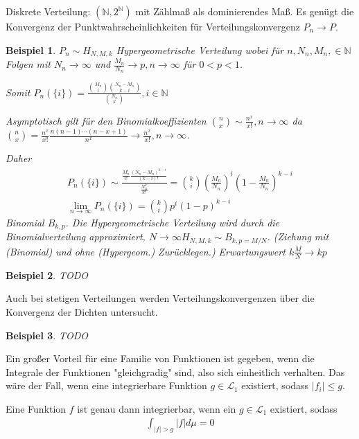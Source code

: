 \documentclass[]{article}
\newtheorem*{example}{Beispiel}
\begin{document}
Diskrete Verteilung: $(\mathbb{N}, 2^\mathbb{N})$ mit Zählmaß als dominierendes Maß. Es genügt die Konvergenz der Punktwahrscheinlichkeiten für Verteilungskonvergenz $P_n \rightarrow P$.

\begin{example}
	$P_n \sim H_{N,M,k}$ Hypergeometrische Verteilung wobei für $n, N_n, M_n, \in \mathbb{N}$ Folgen mit $N_n \rightarrow \infty$ und $\frac{M_n}{N_n} \rightarrow p, n\rightarrow\infty$ für $0 < p < 1$.
	
	Somit $P_n(\{i\}) = \frac{\binom{M_n}{i}\binom{N_n-M_n}{k-i}}{\binom{N_n}{k}}, i\in \mathbb{N}$
	
	Asymptotisch gilt für den Binomialkoeffizienten $\binom{n}{x} \sim \frac{n^x}{x!}, n\rightarrow\infty$ da $\binom{n}{x} = \frac{n^x}{x!} \frac{n(n-1)\cdots(n-x+1)}{n^x} \rightarrow \frac{n^x}{x!}, n\rightarrow\infty$.
	
	Daher
	\begin{align*}
		P_n(\{i\}) \sim \frac{\frac{M_n^i}{i!}\frac{(N_n-M_n)^{k-i}}{(k-i)!}}{\frac{N_n^k}{k!}} = \binom{k}{i} \left(\frac{M_n}{N_n}\right)^i \left(1-\frac{M_n}{N_n}\right)^{k-i}\\
		\lim\limits_{n\rightarrow\infty} P_n(\{i\}) = \binom{k}{i} p^i (1-p)^{k-i}
	\end{align*}
	Binomial $B_{k,p}$. Die Hypergeometrische Verteilung wird durch die Binomialverteilung approximiert, $N\rightarrow\infty H_{N,M,k}\sim B_{k,p=M/N}$. (Ziehung mit (Binomial) und ohne (Hypergeom.) Zurücklegen.) Erwartungswert $k\frac{M}{N} \rightarrow kp$
	
\end{example}

\begin{example}
	TODO
\end{example}

Auch bei stetigen Verteilungen werden Verteilungskonvergenzen über die Konvergenz der Dichten untersucht.

\begin{example}
	TODO
\end{example}

Ein großer Vorteil für eine Familie von Funktionen ist gegeben, wenn die Integrale der Funktionen "gleichgradig" sind, also sich einheitlich verhalten. Das wäre der Fall, wenn eine integrierbare Funktion $g \in \mathcal{L}_1$ existiert, sodass $|f_i| \leq g$.

Eine Funktion $f$ ist genau dann integrierbar, wenn ein $g\in \mathcal{L}_1$ existiert, sodass
\begin{align*}
	\int_{|f|>g} |f| d\mu = 0
\end{align*}
\end{document}
